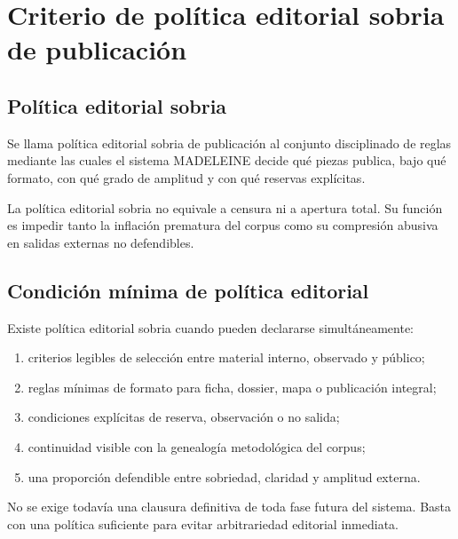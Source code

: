 \chapter{Criterio de política editorial sobria de publicación}

\section{Política editorial sobria}
\begin{definition}
Se llama política editorial sobria de publicación al conjunto disciplinado de reglas mediante las cuales el sistema MADELEINE decide qué piezas publica, bajo qué formato, con qué grado de amplitud y con qué reservas explícitas.
\end{definition}

\begin{observation}
La política editorial sobria no equivale a censura ni a apertura total. Su función es impedir tanto la inflación prematura del corpus como su compresión abusiva en salidas externas no defendibles.
\end{observation}

\section{Condición mínima de política editorial}
\begin{definition}
Existe política editorial sobria cuando pueden declararse simultáneamente:
\begin{enumerate}
  \item criterios legibles de selección entre material interno, observado y público;
  \item reglas mínimas de formato para ficha, dossier, mapa o publicación integral;
  \item condiciones explícitas de reserva, observación o no salida;
  \item continuidad visible con la genealogía metodológica del corpus;
  \item una proporción defendible entre sobriedad, claridad y amplitud externa.
\end{enumerate}
\end{definition}

\begin{observation}
No se exige todavía una clausura definitiva de toda fase futura del sistema. Basta con una política suficiente para evitar arbitrariedad editorial inmediata.
\end{observation}

